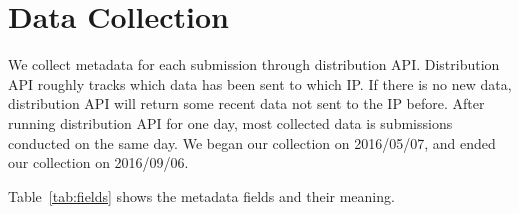 \section{Data Collection}
\label{sec:label}




We collect metadata for each submission through distribution API. 
Distribution API roughly tracks which data has been sent to which IP. 
If there is no new data, distribution API will return some recent data not sent to the IP before. 
After running distribution API for one day, most collected data is submissions conducted on the same day. 
We began our collection on 2016/05/07, and ended our collection on 2016/09/06. 



Table~\ref{tab:fields} shows the metadata fields and their meaning.



